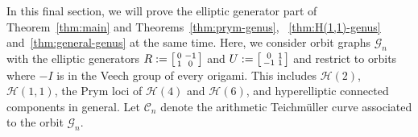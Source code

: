 \documentclass[a4paper,11pt]{amsart}
\numberwithin{equation}{section}
\numberwithin{figure}{section}
\numberwithin{table}{section}
\newcommand{\teichmuller}{Teichm{\"u}ller }
\newcommand{\calH}{\mathcal{H}}
\begin{document}
In this final section, we will prove the elliptic generator part of Theorem~\ref{thm:main} and Theorems~\ref{thm:prym-genus}, ~\ref{thm:H(1,1)-genus} and~\ref{thm:general-genus} at the same time. Here, we consider orbit graphs $\mathcal{G}_{n}$ with the elliptic generators $R:=\begin{bsmallmatrix}
    0 & -1 \\
    1 & 0
\end{bsmallmatrix}$ and $U:=\begin{bsmallmatrix}
    0 & 1 \\
    -1 & 1
\end{bsmallmatrix}$ and restrict to orbits where $-I$ is in the Veech group of every origami. This includes $\calH(2)$, $\calH(1,1)$, the Prym loci of $\calH(4)$ and $\calH(6)$, and hyperelliptic connected components in general. Let $\mathcal{C}_{n}$ denote the arithmetic \teichmuller curve associated to the orbit $\mathcal{G}_{n}$.
\end{document}
